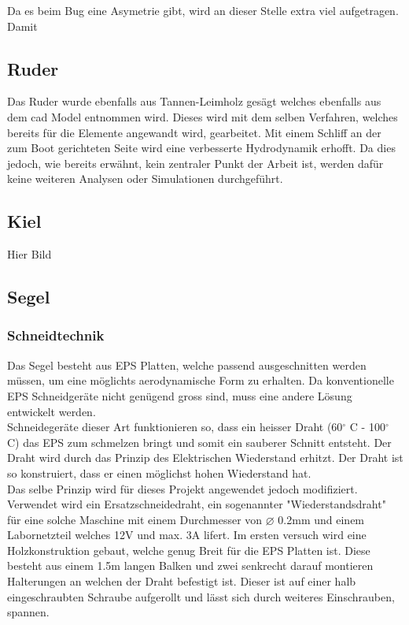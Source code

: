 Da es beim Bug eine Asymetrie gibt, wird an dieser Stelle extra viel aufgetragen. Damit 

\subsection{Ruder}
Das Ruder wurde ebenfalls aus Tannen-Leimholz gesägt welches ebenfalls aus dem \ac{cad} Model entnommen wird. Dieses wird mit dem selben Verfahren, welches bereits für die Elemente angewandt wird, gearbeitet. Mit einem Schliff an der zum Boot gerichteten Seite wird eine verbesserte Hydrodynamik erhofft. Da dies jedoch, wie bereits erwähnt, kein zentraler Punkt der Arbeit ist, werden dafür keine weiteren Analysen oder Simulationen durchgeführt.

\subsection{Kiel}


Hier Bild


\subsection{Segel}
\subsubsection*{Schneidtechnik}
Das Segel besteht aus EPS Platten, welche passend ausgeschnitten werden müssen, um eine möglichts aerodynamische Form zu erhalten. Da konventionelle EPS Schneidgeräte nicht genügend gross sind, muss eine andere Lösung entwickelt werden.  \\
Schneidegeräte dieser Art funktionieren so, dass ein heisser Draht (60$^\circ$ C - 100$^\circ$ C) das EPS zum schmelzen bringt und somit ein sauberer Schnitt entsteht. Der Draht wird durch das Prinzip des Elektrischen Wiederstand erhitzt. Der Draht ist so konstruiert, dass er einen möglichst hohen Wiederstand hat. \\
Das selbe Prinzip wird für dieses Projekt angewendet jedoch modifiziert. Verwendet wird ein Ersatzschneidedraht, ein sogenannter "Wiederstandsdraht" für eine solche Maschine mit einem Durchmesser von $\varnothing$ 0.2mm und einem Labornetzteil welches 12V und max. 3A lifert.
Im ersten versuch wird eine Holzkonstruktion gebaut, welche genug Breit für die EPS Platten ist. Diese besteht aus einem 1.5m langen Balken und zwei senkrecht darauf montieren Halterungen an welchen der Draht befestigt ist. Dieser ist auf einer halb eingeschraubten Schraube aufgerollt und lässt sich durch weiteres Einschrauben, spannen. 


